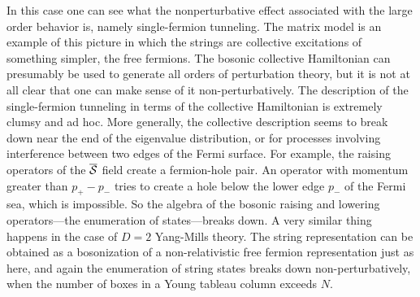 In this case one can see what the
nonperturbative effect associated with the large order 
behavior is, namely single-fermion tunneling.  The
matrix model is an example of this picture in which the
strings are collective excitations of something simpler, the free
fermions.  The bosonic collective Hamiltonian can presumably be
used to generate all orders of perturbation theory, but it is
not at all clear that one can make sense of it non-perturbatively.
The description of the single-fermion tunneling in terms of the
collective Hamiltonian is extremely clumsy and ad hoc.  More
generally, the collective description seems to break down near the
end of the eigenvalue distribution, or for processes involving
interference between two edges of the Fermi surface.  For
example, the raising operators of the $\overline{\cal S}$ field 
create a fermion-hole pair.  An operator with momentum greater
than $p_+ - p_-$ tries to create a hole below the lower edge $p_-$
of the Fermi sea, which is impossible.  So the algebra of the
bosonic raising and lowering operators---the enumeration of
states---breaks down.  A very similar thing happens in the case of
$D=2$ Yang-Mills theory.  The
string representation can be obtained as a bosonization of a
non-relativistic free fermion representation just as here, and
again the enumeration of string states breaks down
non-perturbatively, when the number of boxes in a Young tableau
column exceeds $N$.


